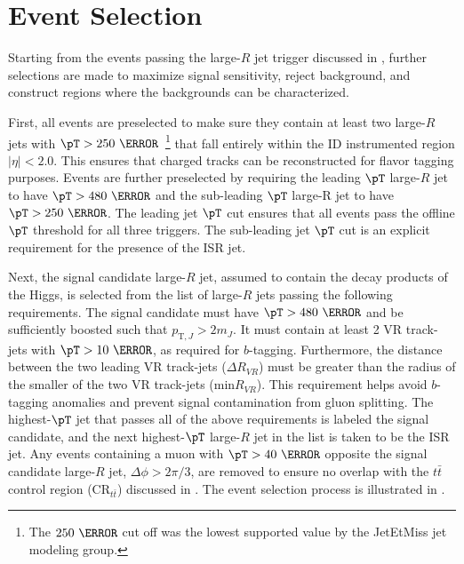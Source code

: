 \section{Event Selection} \label{sec:selection:event_selection}

Starting from the events passing the large-$R$ jet trigger discussed in
, further selections are made to maximize signal
sensitivity, reject background, and construct regions where the backgrounds
can be characterized.  

First, all events are preselected to make sure they contain at least two
large-$R$ jets with $\pT > 250~\GeV$~\footnote{The $250~\GeV$ cut off was the
lowest supported value by the JetEtMiss jet modeling group.} that fall entirely
within the ID instrumented region $|\eta| < 2.0$. This ensures that charged
tracks can be reconstructed for flavor tagging purposes.  Events are further
preselected by requiring the leading $\pT$ large-$R$ jet to have $\pT >
480~\GeV$ and the sub-leading $\pT$ large-R jet to have $\pT > 250~\GeV$. The
leading jet $\pT$ cut ensures that all events pass the offline $\pT$ threshold
for all three triggers.  The sub-leading jet $\pT$ cut is an explicit
requirement for the presence of the ISR jet. 

Next, the signal candidate large-$R$ jet, assumed to contain the decay products
of the Higgs, is selected from the list of large-$R$ jets passing the following
requirements.  The signal candidate must have $\pT > 480~\GeV$ and be
sufficiently boosted such that $p_{\text{T},J} > 2m_{J}$.  It must contain at
least 2 VR track-jets with $\pT > 10~\GeV$, as required for $b$-tagging.
Furthermore, the distance between the two leading VR track-jets ($\Delta
R_{VR}$) must be greater than the radius of the smaller of the two VR
track-jets (min$R_{VR}$).  This requirement helps avoid $b$-tagging anomalies
and prevent signal contamination from gluon splitting.  The highest-$\pT$ jet
that passes all of the above requirements is labeled the signal candidate, and
the next highest-$\pT$ large-$R$ jet in the list is taken to be the ISR jet.
Any events containing a muon with $\pT > 40~\GeV$ opposite the signal candidate
large-$R$ jet, $\Delta \phi > 2\pi/3$, are removed to ensure no overlap with
the $t\bar{t}$ control region ($\text{CR}_{t\bar{t}}$) discussed in
.  The event selection process is illustrated in
.

